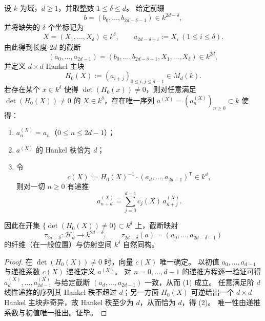 \begin{proposition}\label{prop:xi-hankel-window-fiber-delta}
设 \(k\) 为域，\(d\ge 1\)，并取整数 \(1\le \delta\le d\)。
给定前缀
\[
b=(b_0,\dots,b_{2d-\delta-1})\in k^{2d-\delta},
\]
并将缺失的 \(\delta\) 个坐标记为
\[
X=(X_1,\dots,X_\delta)\in k^\delta,
\qquad
a_{2d-\delta+i}:=X_i\ (1\le i\le\delta).
\]
由此得到长度 \(2d\) 的截断
\[
(a_0,\dots,a_{2d-1})=(b_0,\dots,b_{2d-\delta-1},X_1,\dots,X_\delta)\in k^{2d},
\]
并定义 \(d\times d\) Hankel 主块
\[
H_0(X):=(a_{i+j})_{0\le i,j\le d-1}\in M_d(k).
\]
若存在某个 \(x\in k^\delta\) 使得 \(\det(H_0(x))\neq 0\)，则对任意满足 \(\det(H_0(X))\neq 0\) 的 \(X\in k^\delta\)，存在唯一序列 \(a^{(X)}=(a_n^{(X)})_{n\ge 0}\subset k\) 使得：
\begin{enumerate}
  \item \(a^{(X)}_n=a_n\)（\(0\le n\le 2d-1\)）；
  \item \(a^{(X)}\) 的 Hankel 秩恰为 \(d\)；
  \item 令
  \[
  c(X):=H_0(X)^{-1}\cdot (a_d,\dots,a_{2d-1})^{\mathsf T}\in k^d,
  \]
  则对一切 \(n\ge 0\) 有递推
  \[
  a^{(X)}_{n+d}=\sum_{j=0}^{d-1}c_j(X)\,a^{(X)}_{n+j}.
  \]
\end{enumerate}
因此在开集 \(\{\det(H_0(X))\neq 0\}\subset k^\delta\) 上，截断映射
\[
\tau_{2d-\delta}:\mathcal H_d\to k^{2d-\delta},\qquad
\tau_{2d-\delta}(a)=(a_0,\dots,a_{2d-\delta-1})
\]
的纤维（在一般位置）与仿射空间 \(k^\delta\) 自然同构。
\end{proposition}
\begin{proof}
在 \(\det(H_0(X))\neq 0\) 时，向量 \(c(X)\) 唯一确定。
以初值 \(a_0,\dots,a_{d-1}\) 与递推系数 \(c(X)\) 递推定义 \(a^{(X)}\)。
对 \(n=0,\dots,d-1\) 的递推方程逐一验证可得 \(a^{(X)}_d,\dots,a^{(X)}_{2d-1}\) 与给定截断 \((a_d,\dots,a_{2d-1})\) 一致，从而 (1) 成立。
任意满足阶 \(d\) 线性递推的序列其 Hankel 秩不超过 \(d\)；另一方面 \(H_0(X)\) 可逆给出一个 \(d\times d\) Hankel 主块非奇异，故 Hankel 秩至少为 \(d\)，从而恰为 \(d\)，得 (2)。
唯一性由递推系数与初值唯一推出。证毕。
\end{proof}

\endinput
